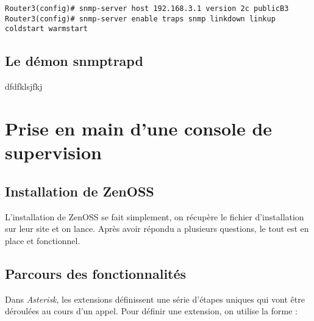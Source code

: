 \documentclass[12pt,a4paper,notitlepage]{article}
\begin{document}
\begin{lstlisting}[title=Activation des traps pour l'état des liens]
Router3(config)# snmp-server host 192.168.3.1 version 2c publicB3
Router3(config)# snmp-server enable traps snmp linkdown linkup coldstart warmstart
\end{lstlisting}

\subsection{Le démon snmptrapd}
dfdfklsjfkj

\section{Prise en main d'une console de supervision}
\subsection{Installation de ZenOSS}
L'installation de ZenOSS se fait simplement, on récupère le fichier d'installation sur leur site et on lance. Après avoir répondu a plusieurs questions, le tout est en place et fonctionnel. \\


\subsection{Parcours des fonctionnalités}

Dans \textit{Asterisk}, les extensions définissent une série d'étapes uniques qui vont être déroulées au cours d'un appel. Pour définir une extension, on utilise la forme : \\

\end{document}
